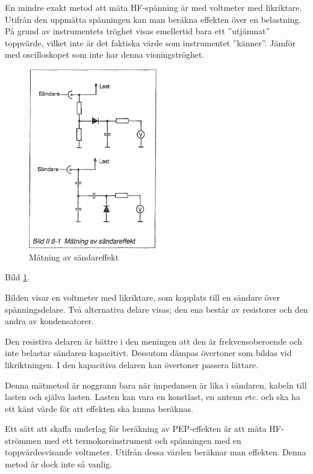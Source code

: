 En mindre exakt metod att mäta HF-spänning är med voltmeter med
likriktare.  Utifrån den uppmätta spänningen kan man beräkna effekten
över en belastning. På grund av instrumentets tröghet visas emellertid
bara ett ''utjämnat'' toppvärde, vilket inte är det faktiska värde som
instrumentet ''känner''. Jämför med oscilloskopet som inte har denna
visningströghet.

\begin{figure}
  \includegraphics[width=0.5\textwidth]{images/bild_2_8-01}
  \caption{Mätning av sändareffekt}
  \label{fig:bildII8-1}
\end{figure}

Bild \ref{fig:bildII8-1}.

Bilden visar en voltmeter med likriktare, som kopplats till en sändare
över spänningsdelare. Två alternativa delare visas; den ena består av
resistorer och den andra av kondensatorer.

Den resistiva delaren är bättre i den meningen att den är
frekvensoberoende och inte belastar sändaren kapacitivt. Dessutom
dämpas övertoner som bildas vid likriktningen. I den kapacitiva
delaren kan övertoner passera lättare.

Denna mätmetod är noggrann bara när impedansen är lika i sändaren,
kabeln till lasten och själva lasten. Lasten kan vara en konstlast, en
antenn etc. och ska ha ett känt värde för att effekten ska kunna
beräknas.

Ett sätt att skaffa underlag för beräkning av PEP-effekten är att mäta
HF-strömmen med ett termokorsinstrument och spänningen med en
toppvärdesvisande voltmeter.  Utifrån dessa värden beräknar man
effekten. Denna metod är dock inte så vanlig.

